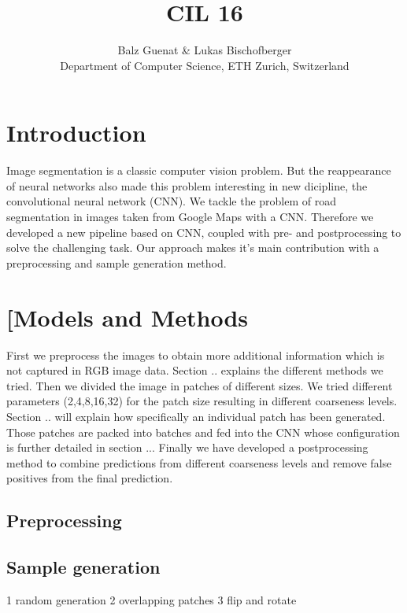\documentclass[10pt,conference,compsocconf]{IEEEtran}
\begin{document}
\title{CIL 16}

\author{
 Balz Guenat \& Lukas Bischofberger\\
  Department of Computer Science, ETH Zurich, Switzerland
}

\maketitle

\begin{abstract}
  
\end{abstract}

\section{Introduction}
Image segmentation is a classic computer vision problem. But the reappearance of neural networks also made this problem interesting in new dicipline, the convolutional neural network (CNN). We tackle the problem of road segmentation in images taken from Google Maps with a CNN. Therefore we developed a new pipeline based on CNN, coupled with pre- and postprocessing to solve the challenging task. Our approach makes it's main contribution with a preprocessing and sample generation method.


\section{[Models and Methods}
First we preprocess the images to obtain more additional information which is not captured in RGB image data. Section .. explains the different methods we tried.
Then we divided the image in patches of different sizes. We tried different parameters (2,4,8,16,32) for the patch size resulting in different coarseness levels. Section .. will explain how specifically an individual patch has been generated. Those patches are packed into batches and fed into the CNN whose configuration is further detailed in section ... Finally we have developed a postprocessing method to combine predictions from different coarseness levels and remove false positives from the final prediction.

\subsection{Preprocessing}

\subsection{Sample generation}
1 random generation
2 overlapping patches
3 flip and rotate
\end{document}

